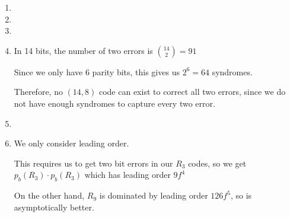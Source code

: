 \begin{enumerate}[label=1.\arabic*]
\begin{enumerate}
    \end{enumerate}


      \item

      \item
      \item
      \item

        In 14 bits, the number of two errors is $\binom{14}{2} = 91$

        Since we only have 6 parity bits, this gives us $2^6 = 64$ syndromes.

        Therefore, no $(14,8)$ code can exist to correct all two errors, since we do not have enough syndromes to capture every two error.

      \item
      \item
        We only consider leading order.

        This requires us to get two bit errors in our $R_3$ codes, so we get $p_b(R_3) \cdot p_b(R_3)$ which has leading order $9f^4$

        On the other hand, $R_9$ is dominated by leading order $126f^5$, so is asymptotically better.




        
\end{enumerate}

